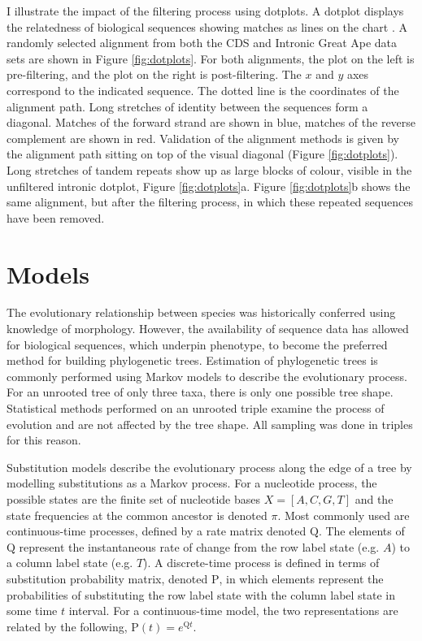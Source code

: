 I illustrate the impact of the filtering process using dotplots. A dotplot displays the relatedness of biological sequences showing matches as lines on the chart \citep{Gibbs1970TheSequences}. A randomly selected alignment from both the CDS and Intronic Great Ape data sets are shown in Figure \ref{fig:dotplots}. For both alignments, the plot on the left is pre-filtering, and the plot on the right is post-filtering. The $x$ and $y$ axes correspond to the indicated sequence. The dotted line is the coordinates of the alignment path. Long stretches of identity between the sequences form a diagonal. Matches of the forward strand are shown in blue, matches of the reverse complement are shown in red. Validation of the alignment methods is given by the alignment path sitting on top of the visual diagonal (Figure \ref{fig:dotplots}). Long stretches of tandem repeats show up as large blocks of colour, visible in the unfiltered intronic dotplot, Figure \ref{fig:dotplots}a. Figure \ref{fig:dotplots}b shows the same alignment, but after the filtering process, in which these repeated sequences have been removed.



\section{Models}

The evolutionary relationship between species was historically conferred using knowledge of morphology. However, the availability of sequence data has allowed for biological sequences, which underpin phenotype, to become the preferred method for building phylogenetic trees. Estimation of phylogenetic trees is commonly performed using Markov models to describe the evolutionary process. For an unrooted tree of only three taxa, there is only one possible tree shape. Statistical methods performed on an unrooted triple examine the process of evolution and are not affected by the tree shape. All sampling was done in triples for this reason.

Substitution models describe the evolutionary process along the edge of a tree by modelling substitutions as a Markov process. For a nucleotide process, the possible states are the finite set of nucleotide bases $X = [A, C, G, T]$ and the state frequencies at the common ancestor is denoted $\pi$. Most commonly used are continuous-time processes, defined by a rate matrix denoted $\mathrm{Q}$. The elements of $\mathrm{Q}$ represent the instantaneous rate of change from the row label state (e.g. $A$) to a column label state (e.g. $T$). A discrete-time process is defined in terms of substitution probability matrix, denoted $\mathrm{P}$, in which elements represent the probabilities of substituting the row label state with the column label state in some time $t$ interval. For a continuous-time model, the two representations are related by the following, $\mathrm{P}(t) = e^{\mathrm{Q}t}$. 

